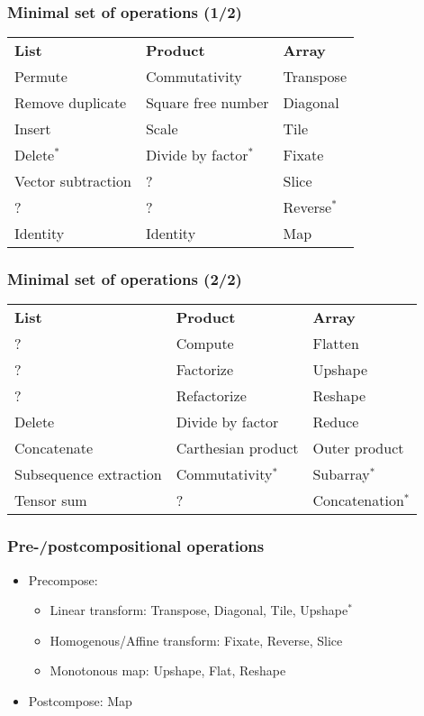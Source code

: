 \documentclass[xetex,mathserif,serif]{beamer}
\begin{document}
\begin{frame}
  \frametitle{Minimal set of operations (1/2)}
  \pause
  \footnotesize
  \begin{center}
    \begin{tabular}{lll}
      \bfseries List & \bfseries Product & \bfseries Array  \pause\\
      Permute \pause& Commutativity  \pause& Transpose  \pause\\
      Remove duplicate \pause& Square free number  \pause& Diagonal  \pause\\
      Insert \pause& Scale  \pause& Tile  \pause\\
      Delete$^*$ \pause& Divide by factor$^*$  \pause& Fixate  \pause\\
      Vector subtraction \pause& ?  \pause& Slice  \pause\\
      ? & ? & Reverse$^*$  \pause\\
      Identity & Identity & Map 
    \end{tabular}
  \end{center}
\end{frame}

\begin{frame}
  \frametitle{Minimal set of operations (2/2)}
  \pause
  \footnotesize
  \begin{center}
    \begin{tabular}{lll}
      \bfseries List & \bfseries Product & \bfseries Array  \pause\\
      ? & Compute \pause& Flatten \pause\\
      ? & Factorize \pause& Upshape \pause\\
      ? & Refactorize \pause& Reshape \pause\\
      Delete \pause& Divide by factor \pause& Reduce \pause\\
      Concatenate \pause& Carthesian product \pause& Outer product \pause\\
      Subsequence extraction \pause& Commutativity$^*$ \pause& Subarray$^*$ \pause\\
      Tensor sum & ? \pause& Concatenation$^*$
    \end{tabular}
  \end{center}
\end{frame}

\begin{frame}
  \frametitle{Pre-/postcompositional operations}
  \pause
  \begin{itemize}[<+->]
    \item Precompose:
    \begin{itemize}[<+->]
      \item Linear transform: Transpose, Diagonal, Tile, Upshape$^*$
      \item Homogenous/Affine transform: Fixate, Reverse, Slice
      \item Monotonous map: Upshape, Flat, Reshape
    \end{itemize}
    \item Postcompose: Map
  \end{itemize}
\end{frame}
\end{document}
